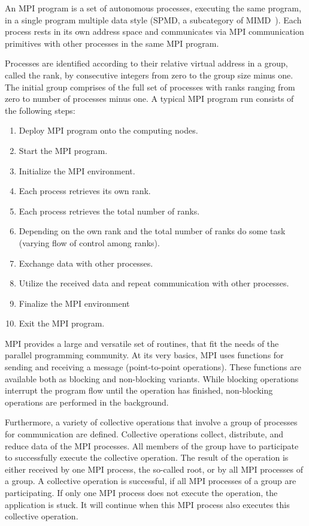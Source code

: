 An MPI program is a set of autonomous processes, executing the same
program, in a single program multiple data style (SPMD, a subcategory
of MIMD~\cite{Flynn:1972:COE:1952456.1952459}). Each process rests in
its own address space and communicates via MPI communication
primitives with other processes in the same MPI program.

Processes are identified according to their relative virtual address
in a group, called the rank, by consecutive integers from zero to the
group size minus one. The initial group comprises of the full set of
processes with ranks ranging from zero to number of processes minus
one. A typical MPI program run consists of the following steps:

\begin{enumerate}
\item Deploy MPI program onto the computing nodes.
\item Start the MPI program.
\item Initialize the MPI environment.
\item Each process retrieves its own rank.
\item Each process retrieves the total number of ranks.
\item Depending on the own rank and the total number of ranks do some
  task\\ (varying flow of control among ranks).
\item Exchange data with other processes.
\item Utilize the received data and repeat communication with other processes.
\item Finalize the MPI environment
\item Exit the MPI program.
\end{enumerate}

\noindent MPI provides a large and versatile set of routines, that fit the needs
of the parallel programming community. At its very basics, MPI uses
functions for sending and receiving a message (point-to-point
operations).  These functions are available both as blocking and
non-blocking variants. While blocking operations interrupt the program
flow until the operation has finished, non-blocking operations are
performed in the background.

Furthermore, a variety of collective operations that involve a group
of processes for communication are defined. Collective operations
collect, distribute, and reduce data of the MPI processes.  All members
of the group have to participate to successfully execute the
collective operation.  The result of the operation is either received
by one MPI process, the so-called root, or by all MPI processes of a group.  A
collective operation is successful, if all MPI processes of a
group are participating. If only one MPI process does not execute the
operation, the application is stuck. It will continue when
this MPI process also executes this collective operation.


